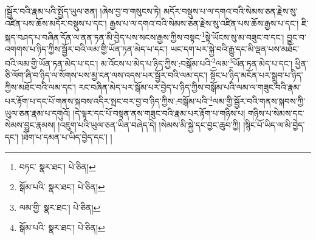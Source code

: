 །སྦྱོར་བའི་རྣམ་པའི་སྤྱོད་ཡུལ་ཅན། །ཞེས་བྱ་བ་གསུངས་ཏེ། མདོར་བསྡུས་པ་ལ་དགའ་བའི་སེམས་ཅན་རྗེས་སུ་འཛིན་པས་ཆོས་མདོར་བསྡུས་པ་དང་། རྒྱས་པ་ལ་དགའ་བའི་སེམས་ཅན་རྗེས་སུ་འཛིན་པས་ཆོས་རྒྱས་པ་དང་། ཇི་སྐད་བཤད་པ་བཞིན་དོན་ལ་ནན་ཏན་མི་བྱེད་པས་སངས་རྒྱས་ཀྱིས་བསྟང་\footnote{བཏང་  སྣར་ཐང་།  པེ་ཅིན། }སྟེ་ཡོངས་སུ་མ་བཟུང་བ་དང་། བྱུང་བ་འགགས་པ་ཉིད་ཀྱིས་སྦྱོར་བའི་ལམ་གྱི་ཡོན་ཏན་མེད་པ་དང་། ཡང་དག་པར་སྐྱེ་བའི་རྒྱུ་དང་མི་ལྡན་པས་མཐོང་བའི་ལམ་གྱི་ཡོན་ཏན་མེད་པ་དང་། མ་འོངས་པ་མེད་པ་ཉིད་ཀྱིས་:བསྒོམ་པའི་\footnote{སྒོམ་པའི་  སྣར་ཐང་།  པེ་ཅིན། }ལམ་\footnote{ལམ་གྱི་  སྣར་ཐང་།  པེ་ཅིན། }ཡོན་ཏན་མེད་པ་དང་། ཕྱིན་ཅི་ལོག་ཞི་བ་ཉིད་ལ་སོགས་པས་མྱ་ངན་ལས་འདས་པར་སྦྱོར་བའི་ལམ་དང་། སྟོང་པ་ཉིད་མངོན་པར་སྒྲུབ་པ་ཉིད་ཀྱིས་མཐོང་བའི་ལམ་དང་། རང་བཞིན་མེད་པར་སྒོམ་པར་བྱེད་པ་ཉིད་ཀྱིས་བསྒོམ་པའི་ལམ་ལ་གཟུང་བའི་རྣམ་པར་རྟོག་པ་དང་པོ་གནས་སྐབས་འདིར་སྤང་བར་བྱ་བ་ཉིད་ཀྱིས་:བསྒོམ་པའི་\footnote{སྒོམ་པའི་  སྣར་ཐང་།  པེ་ཅིན། }ལམ་གྱི་སྦྱོར་བའི་གནས་སྐབས་ཀྱི་ཡུལ་ཅན་རྣམ་པ་དགུའོ། །དེ་ལྟར་དང་པོ་བསྟན་ནས་གཟུང་བའི་རྣམ་པར་རྟོག་པ་གཉིས་པ། གཉིས་པ་སེམས་དང་སེམས་བྱུང་རྣམས། །འཇུག་པའི་ཡུལ་ཅན་ཡིན་བཞེད་དེ། །སེམས་མི་སྐྱེ་དང་བྱང་ཆུབ་ཀྱི། །སྙིང་པོ་ཡིད་ལ་མི་བྱེད་དང་། །ཐེག་པ་དམན་པ་ཡིད་བྱེད་དང་། །
